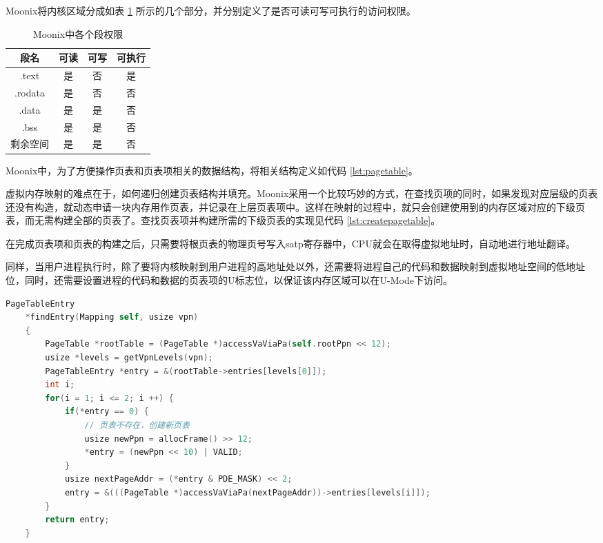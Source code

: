 Moonix将内核区域分成如表 \ref{tab:sectionprivilege} 所示的几个部分，并分别定义了是否可读可写可执行的访问权限。

\begin{table}[h]
	\centering
	\caption{Moonix中各个段权限}
	\label{tab:sectionprivilege}
	\begin{tabular}{|c|c|c|c|}
		\hline
		段名      & 可读 & 可写 & 可执行 \\ \hline
		.text   & 是  & 否  & 是   \\ \hline
		.rodata & 是  & 否  & 否   \\ \hline
		.data   & 是  & 是  & 否   \\ \hline
		.bss    & 是  & 是  & 否   \\ \hline
		剩余空间    & 是  & 是  & 否   \\ \hline
	\end{tabular}
\end{table}

Moonix中，为了方便操作页表和页表项相关的数据结构，将相关结构定义如代码 \ref{lst:pagetable}。

虚拟内存映射的难点在于，如何递归创建页表结构并填充。Moonix采用一个比较巧妙的方式，在查找页项的同时，如果发现对应层级的页表还没有构造，就动态申请一块内存用作页表，并记录在上层页表项中。这样在映射的过程中，就只会创建使用到的内存区域对应的下级页表，而无需构建全部的页表了。查找页表项并构建所需的下级页表的实现见代码 \ref{lst:createpagetable}。

在完成页表项和页表的构建之后，只需要将根页表的物理页号写入satp寄存器中，CPU就会在取得虚拟地址时，自动地进行地址翻译。

同样，当用户进程执行时，除了要将内核映射到用户进程的高地址处以外，还需要将进程自己的代码和数据映射到虚拟地址空间的低地址位，同时，还需要设置进程的代码和数据的页表项的U标志位，以保证该内存区域可以在U-Mode下访问。

\begin{minipage}[c]{0.95\textwidth}
\begin{lstlisting}[language={C}, caption={查找页表项}, label={lst:createpagetable}]
	PageTableEntry
	*findEntry(Mapping self, usize vpn)
	{
		PageTable *rootTable = (PageTable *)accessVaViaPa(self.rootPpn << 12);
		usize *levels = getVpnLevels(vpn);
		PageTableEntry *entry = &(rootTable->entries[levels[0]]);
		int i;
		for(i = 1; i <= 2; i ++) {
			if(*entry == 0) {
				// 页表不存在，创建新页表
				usize newPpn = allocFrame() >> 12;
				*entry = (newPpn << 10) | VALID;
			}
			usize nextPageAddr = (*entry & PDE_MASK) << 2;
			entry = &(((PageTable *)accessVaViaPa(nextPageAddr))->entries[levels[i]]);
		}
		return entry;
	}
\end{lstlisting}
\end{minipage}

